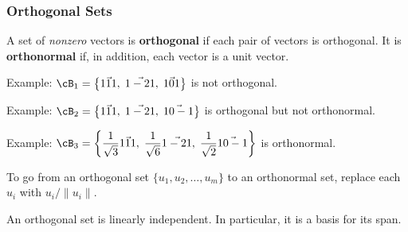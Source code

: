 




\begin{frame}
\frametitle{Orthogonal Sets}

\vskip-3mm
\begin{defn}
  A set of \emph{nonzero} vectors is \textbf{orthogonal} if each pair of vectors
  is orthogonal.
  \pause
  It is \textbf{orthonormal} if, in addition, each vector is a unit vector.
\end{defn}

\pause\medskip
\alert{Example:} $\cB_1 = \left\{\vec{1 1 1},\;\vec{1 -2 1},\;\vec{1 0 1}\right\}$
is not orthogonal.

\pause\medskip
\alert{Example:} $\cB_2 = \left\{\vec{1 1 1},\;\vec{1 -2 1},\;\vec{1 0 -1}\right\}$
is orthogonal but not orthonormal.

\pause\medskip
\alert{Example:} 
$\displaystyle\cB_3 = \left\{\frac 1{\sqrt 3}\vec{1 1 1},\;
  \frac 1{\sqrt 6}\vec{1 -2 1},\;
  \frac 1{\sqrt 2}\vec{1 0 -1}\right\}$
is orthonormal.

\pause\medskip
To go from an orthogonal set $\{u_1,u_2,\ldots,u_m\}$ to an orthonormal set,
replace each $u_i$ with $u_i/\|u_i\|$.

\pause\medskip
\begin{thm}
  An orthogonal set is linearly independent.  In particular, it is a basis for
  its span.
\end{thm}

\end{frame}



